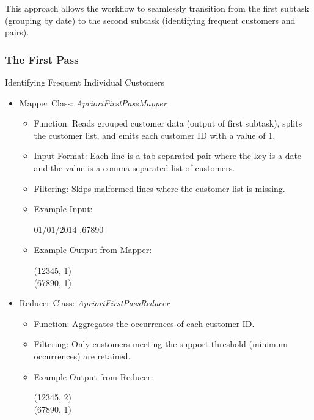 This approach allows the workflow to seamlessly transition from the first subtask (grouping by date) to the second subtask (identifying frequent customers and pairs).

\subsubsection{The First Pass} Identifying Frequent Individual Customers

\begin{itemize}
    \item Mapper Class: \textit{AprioriFirstPassMapper}
    \begin{itemize}
        \item Function: Reads grouped customer data (output of first subtask), splits the customer list, and emits each customer ID with a value of 1.
        \item Input Format: Each line is a tab-separated pair where the key is a date and the value is a comma-separated list of customers.
        \item Filtering: Skips malformed lines where the customer list is missing.
        \item Example Input:
        \begin{center}
            01/01/2014 ,67890
        \end{center}
        \item Example Output from Mapper:
        \begin{center}
        (12345, 1)\\
        (67890, 1)
        \end{center}
    \end{itemize}

    \item Reducer Class: \textit{AprioriFirstPassReducer}
    \begin{itemize}
        \item Function: Aggregates the occurrences of each customer ID.
        \item Filtering: Only customers meeting the support threshold (minimum occurrences) are retained.
        \item Example Output from Reducer:
        \begin{center}
        (12345, 2)\\
        (67890, 1)
        \end{center}
    \end{itemize}
\end{itemize}

